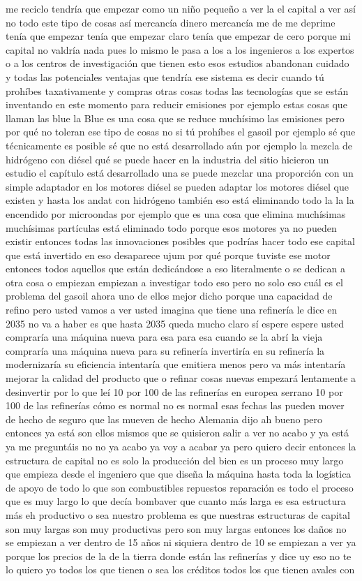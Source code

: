 me reciclo tendría que empezar como un niño pequeño a ver la el capital a ver así no todo este tipo de cosas así mercancía dinero mercancía me de me deprime tenía que empezar tenía que empezar claro tenía que empezar de cero porque mi capital no valdría nada pues lo mismo le pasa a los a los ingenieros a los expertos o a los centros de investigación que tienen esto esos estudios abandonan cuidado y todas las potenciales ventajas que tendría ese sistema es decir cuando tú prohíbes taxativamente y compras otras cosas todas las tecnologías que se están inventando en este momento para reducir emisiones por ejemplo estas cosas que llaman las blue la Blue es una cosa que se reduce muchísimo las emisiones pero por qué no toleran ese tipo de cosas no si tú prohíbes el gasoil por ejemplo sé que técnicamente es posible sé que no está desarrollado aún por ejemplo la mezcla de hidrógeno con diésel qué se puede hacer en la industria del sitio hicieron un estudio el capítulo está desarrollado una se puede mezclar una proporción con un simple adaptador en los motores diésel se pueden adaptar los motores diésel que existen y hasta los andat con hidrógeno también eso está eliminando todo la la la encendido por microondas por ejemplo que es una cosa que elimina muchísimas muchísimas partículas está eliminado todo porque esos motores ya no pueden existir entonces todas las innovaciones posibles que podrías hacer todo ese capital que está invertido en eso desaparece ujum por qué porque tuviste ese motor entonces todos aquellos que están dedicándose a eso literalmente o se dedican a otra cosa o empiezan empiezan a investigar todo eso pero no solo eso cuál es el problema del gasoil ahora uno de ellos mejor dicho porque una capacidad de refino pero usted vamos a ver usted imagina que tiene una refinería le dice en 2035 no va a haber es que hasta 2035 queda mucho claro sí espere espere usted compraría una máquina nueva para esa para esa cuando se la abrí la vieja compraría una máquina nueva para su refinería invertiría en su refinería la modernizaría su eficiencia intentaría que emitiera menos pero va más intentaría mejorar la calidad del producto que o refinar cosas nuevas empezará lentamente a desinvertir por lo que leí 10 por 100 de las refinerías en europea serrano 10 por 100 de las refinerías cómo es normal no es normal esas fechas las pueden mover de hecho de seguro que las mueven de hecho Alemania dijo ah bueno pero entonces ya está son ellos mismos que se quisieron salir a ver no acabo y ya está ya me preguntáis no no ya acabo ya voy a acabar ya pero quiero decir entonces la estructura de capital no es solo la producción del bien es un proceso muy largo que empieza desde el ingeniero que que diseña la máquina hasta toda la logística de apoyo de todo lo que son combustibles repuestos reparación es todo el proceso que es muy largo lo que decía bombaver que cuanto más larga es esa estructura más eh productivo o sea nuestro problema es que nuestras estructuras de capital son muy largas son muy productivas pero son muy largas entonces los daños no se empiezan a ver dentro de 15 años ni siquiera dentro de 10 se empiezan a ver ya porque los precios de la de la tierra donde están las refinerías y dice uy eso no te lo quiero yo todos los que tienen o sea los créditos todos los que tienen avales con 
